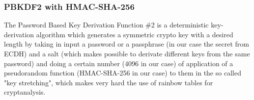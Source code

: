 \subsubsection{PBKDF2 with HMAC-SHA-256}
The Password Based Key Derivation Function \#2 is a deterministic key-derivation algorithm which generates a symmetric crypto key with a desired length by taking in input a password or a passphrase (in our case the secret from ECDH) and a salt (which makes possible to derivate different keys from the same password) and doing a certain number (4096 in our case) of application of a pseudorandom function (HMAC-SHA-256 in our case) to them in the so called "key stretching", which makes very hard the use of rainbow tables for cryptanalysis.